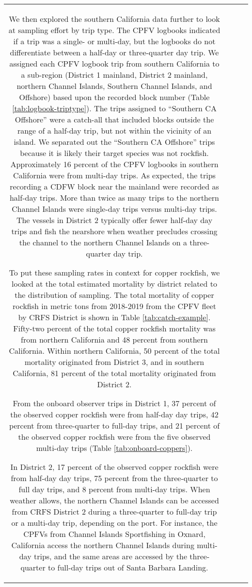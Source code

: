 \documentclass[11pt,
  letterpaper,
]{article}
\begin{document}
\begin{longtable}[t]{c>{\centering\arraybackslash}p{2cm}>{\centering\arraybackslash}p{2cm}>{\centering\arraybackslash}p{2cm}}
We then explored the southern California data further to look at sampling effort by trip type. The CPFV logbooks indicated if a trip was a single- or multi-day, but the logbooks do not differentiate between a half-day or three-quarter day trip. We assigned each CPFV logbook trip from southern California to a sub-region (District 1 mainland, District 2 mainland, northern Channel Islands, Southern Channel Islands, and Offshore) based upon the recorded block number (Table \ref{tab:logbook-triptype}). The trips assigned to ``Southern CA Offshore'' were a catch-all that included blocks outside the range of a half-day trip, but not within the vicinity of an island. We separated out the ``Southern CA Offshore'' trips because it is likely their target species was not rockfish. Approximately 16 percent of the CPFV logbooks in southern California were from multi-day trips. As expected, the trips recording a CDFW block near the mainland were recorded as half-day trips. More than twice as many trips to the northern Channel Islands were single-day trips versus multi-day trips. The vessels in District 2 typically offer fewer half-day day trips and fish the nearshore when weather precludes crossing the channel to the northern Channel Islands on a three-quarter day trip.

To put these sampling rates in context for copper rockfish, we looked at the total estimated mortality by district related to the distribution of sampling. The total mortality of copper rockfish in metric tons from 2018-2019 from the CPFV fleet by CRFS District is shown in Table \ref{tab:catch-example}. Fifty-two percent of the total copper rockfish mortality was from northern California and 48 percent from southern California. Within northern California, 50 percent of the total mortality originated from District 3, and in southern California, 81 percent of the total mortality originated from District 2.

From the onboard observer trips in District 1, 37 percent of the observed copper rockfish were from half-day day trips, 42 percent from three-quarter to full-day trips, and 21 percent of the observed copper rockfish were from the five observed multi-day trips (Table \ref{tab:onboard-coppers}).

In District 2, 17 percent of the observed copper rockfish were from half-day day trips, 75 percent from the three-quarter to full day trips, and 8 percent from multi-day trips. When weather allows, the northern Channel Islands can be accessed from CRFS District 2 during a three-quarter to full-day trip or a multi-day trip, depending on the port. For instance, the CPFVs from Channel Islands Sportfishing in Oxnard, California access the northern Channel Islands during multi-day trips, and the same areas are accessed by the three-quarter to full-day trips out of Santa Barbara Landing.


\end{longtable}
\end{document}
